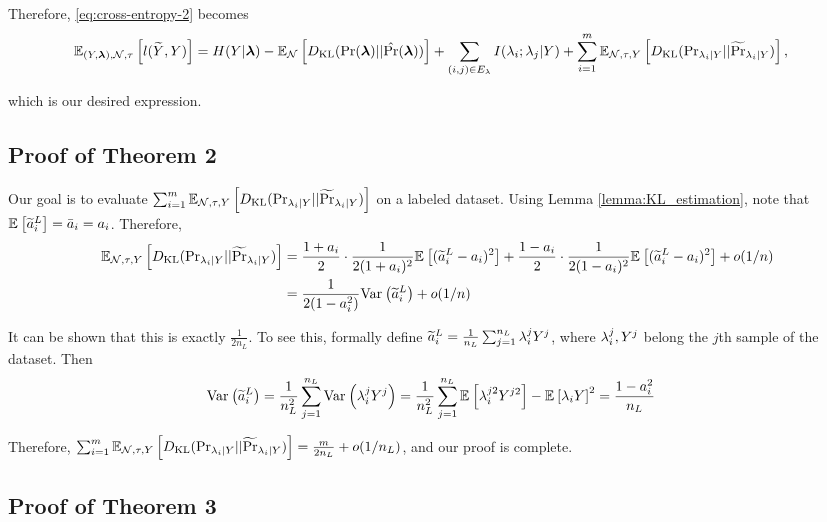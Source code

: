 Therefore, \eqref{eq:cross-entropy-2} becomes
\begin{align}
    \mathbb{E}_{(Y, \bm{\lambda}), \mathcal{N}, \tau}\left[l(\widetilde{Y}, Y)\right] &= H(Y | \bm{\lambda}) - \mathbb{E}_{\mathcal{N}}\left[D_{\mathrm{KL}} (\Pr(\bm{\lambda}) || \hat{\Pr}(\bm{\lambda}))\right] + \sum_{(i, j) \in E_{\lambda}} I(\lambda_i; \lambda_j | Y) + \sum_{i = 1}^m \mathbb{E}_{\mathcal{N}, \tau, Y}\left[D_{\mathrm{KL}} (\mathrm{Pr}_{\lambda_i | Y} || \widetilde{\Pr}_{\lambda_i | Y} )\right], \nonumber 
\end{align}

which is our desired expression.


\subsection{Proof of Theorem 2}

Our goal is to evaluate $\sum_{i = 1}^m \mathbb{E}_{\mathcal{N}, \tau, Y}\left[D_{\mathrm{KL}} (\mathrm{Pr}_{\lambda_i | Y} || \widetilde{\Pr}_{\lambda_i | Y} )\right]$ on a labeled dataset. Using Lemma \ref{lemma:KL_estimation}, note that $\mathbb{E}_{}\left[\widetilde{a}_i^L\right] = \bar{a}_i = a_i$. Therefore,
\begin{align*}
   \mathbb{E}_{\mathcal{N}, \tau, Y}\left[D_{\mathrm{KL}} (\mathrm{Pr}_{\lambda_i | Y} || \widetilde{\Pr}_{\lambda_i | Y} )\right] &= \frac{1 + a_i}{2} \cdot \frac{1}{2(1 + a_i)^2} \mathbb{E}_{}\left[(\widetilde{a}_i^L - a_i)^2\right] + \frac{1 - a_i}{2} \cdot \frac{1}{2(1 - a_i)^2} \mathbb{E}_{}\left[(\widetilde{a}_i^L - a_i)^2\right] + o(1/n) \\
   &=  \frac{1}{2(1 - a_i^2)} \mathrm{Var}_{}\left(\widetilde{a}_i^L\right) + o(1/n)
\end{align*}

It can be shown that this is exactly $\frac{1}{2n_L}$. To see this, formally define $\widetilde{a}_i^L = \frac{1}{n_L} \sum_{j = 1}^{n_L} \lambda_i^j Y^j$, where $\lambda_i^j, Y^j$ belong the $j$th sample of the dataset. Then
\begin{align}
    \mathrm{Var}_{}\left(\widetilde{a}_i^L\right) &= \frac{1}{n_L^2} \sum_{j = 1}^{n_L} \mathrm{Var}_{}\left(\lambda_i^j Y^j\right) = \frac{1}{n_L^2} \sum_{j = 1}^{n_L} \mathbb{E}_{}\left[\lambda_i^{j2} Y^{j2}\right] - \mathbb{E}_{}\left[\lambda_i Y\right]^2 = \frac{1 -a_i^2}{n_L}
\end{align}

Therefore, $\sum_{i = 1}^m \mathbb{E}_{\mathcal{N}, \tau, Y}\left[D_{\mathrm{KL}} (\mathrm{Pr}_{\lambda_i | Y} || \widetilde{\Pr}_{\lambda_i | Y} )\right] = \frac{m}{2n_L} + o(1/n_L)$, and our proof is complete.

\subsection{Proof of Theorem 3} 

